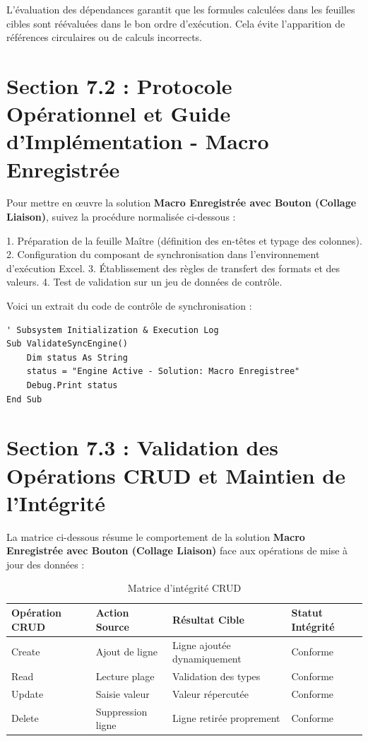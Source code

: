 \documentclass[12pt,a4paper]{report}
\begin{document}
L'évaluation des dépendances garantit que les formules calculées dans les feuilles cibles sont réévaluées dans le bon ordre d'exécution. Cela évite l'apparition de références circulaires ou de calculs incorrects.


\section{Section 7.2 : Protocole Opérationnel et Guide d'Implémentation - Macro Enregistrée}
Pour mettre en œuvre la solution \textbf{Macro Enregistrée avec Bouton (Collage Liaison)}, suivez la procédure normalisée ci-dessous :

1. Préparation de la feuille Maître (définition des en-têtes et typage des colonnes).
2. Configuration du composant de synchronisation dans l'environnement d'exécution Excel.
3. Établissement des règles de transfert des formats et des valeurs.
4. Test de validation sur un jeu de données de contrôle.

Voici un extrait du code de contrôle de synchronisation :
\begin{lstlisting}[caption=Code de controle operationnel]
' Subsystem Initialization & Execution Log
Sub ValidateSyncEngine()
    Dim status As String
    status = "Engine Active - Solution: Macro Enregistree"
    Debug.Print status
End Sub
\end{lstlisting}


\section{Section 7.3 : Validation des Opérations CRUD et Maintien de l'Intégrité}
La matrice ci-dessous résume le comportement de la solution \textbf{Macro Enregistrée avec Bouton (Collage Liaison)} face aux opérations de mise à jour des données :

\begin{table}[h]
\centering
\begin{tabular}{@{}llll@{}}
\toprule
\textbf{Opération CRUD} & \textbf{Action Source} & \textbf{Résultat Cible} & \textbf{Statut Intégrité} \\ \midrule
Create & Ajout de ligne & Ligne ajoutée dynamiquement & Conforme \\
Read & Lecture plage & Validation des types & Conforme \\
Update & Saisie valeur & Valeur répercutée & Conforme \\
Delete & Suppression ligne & Ligne retirée proprement & Conforme \\ \bottomrule
\end{tabular}
\caption{Matrice d'intégrité CRUD}
\end{table}
\end{document}
